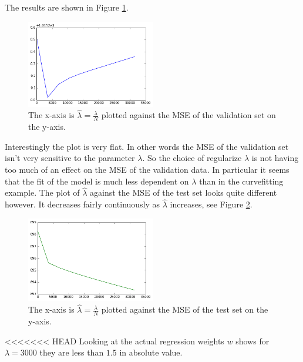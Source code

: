 \documentclass{article}
\begin{document}
The results are shown in Figure \ref{blog-model-selection}.
%
%
%
\begin{figure}[h]
\centering
\includegraphics[width=0.5\textwidth]{blog-model-selection}
\caption{The x-axis is $\hat{\lambda} = \frac{\lambda}{N}$ plotted against the MSE of the validation set on the y-axis.}
\label{blog-model-selection}
\end{figure}
%
Interestingly the plot is very flat. In other words the MSE of the validation set isn't very sensitive to the parameter $\lambda$.  So the choice of regularize $\lambda$ is not having too much of an effect on the MSE of the validation data. In particular it seems that the fit of the model is much less dependent on $\lambda$ than in the curvefitting example.  The plot of $\hat{\lambda}$ against the MSE of the test set looks quite different however. It decreases fairly continuously as $\hat{\lambda}$ increases, see Figure \ref{blog-model-select-test}.
\begin{figure}[h]
\centering
\includegraphics[width=0.5\textwidth]{blog-model-select-test}
\caption{The x-axis is $\hat{\lambda} = \frac{\lambda}{N}$ plotted against the MSE of the test set on the y-axis.}
\label{blog-model-select-test}
\end{figure}
<<<<<<< HEAD
 Looking at the actual regression weights $w$ shows for $\lambda = 3000$ they are less than $1.5$ in absolute value.
\end{document}
